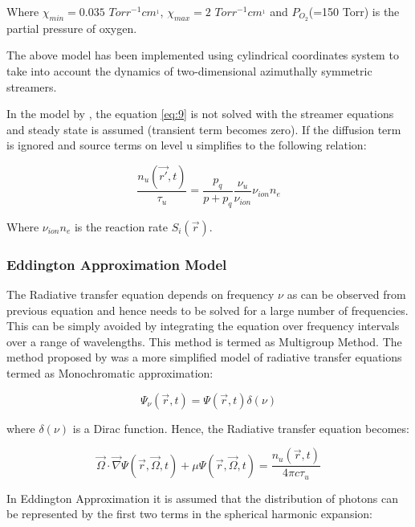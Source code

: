 \documentclass{article}
\begin{document}
Where $\chi_{min}= 0.035$ $Torr^{-1} cm^_1$, $\chi_{max}= 2$ $Torr^{-1} cm^_1$ and $P_O_2$(=150 Torr) is the partial pressure of oxygen.

The above model has been implemented using cylindrical coordinates system to take into account the dynamics of two-dimensional azimuthally symmetric streamers.

In the model by \cite{ZhelezniakM.B.andMnatsakanianA.K.andSizykh1982PhotoionizationDischarge}, the equation \ref{eq:9} is not solved with the streamer equations and steady state is assumed (transient term becomes zero). If the diffusion term is ignored and source terms on level u simplifies to the following relation:

\begin{equation}
\frac{n_u(\vec{r'},t)}{\tau_u} = \frac{p_q}{p+p_q} \frac{\nu_u}{\nu_{ion}} \nu_{ion} n_e
\end{equation} 

Where $\nu_{ion} n_e$ is the reaction rate $S_i(\vec{r})$.






\subsubsection{Eddington Approximation Model}
The Radiative transfer equation depends on frequency $\nu$ as can be observed from previous equation and hence needs to be solved for a large number of frequencies. This can be simply avoided by integrating the equation over frequency intervals over a range of wavelengths. This method is termed as Multigroup Method. The method proposed by \cite{Segur2006} was a more simplified model of radiative transfer equations termed as Monochromatic approximation:

\begin{equation}
\Psi_\nu(\vec{r},t) = \Psi(\vec{r},t) \delta(\nu)
\end{equation} 

where $\delta(\nu)$ is a Dirac function. Hence, the Radiative transfer equation becomes:

\begin{equation} \label{eq:10}
\vec{\Omega} \cdot \vec{\nabla} \Psi(\vec{r},\vec{\Omega},t) + \mu\Psi(\vec{r},\vec{\Omega},t) = \frac{n_u (\vec{r},t)}{4 \pi c \tau_{u}}
\end{equation}

In Eddington Approximation it is assumed that the distribution of photons can be represented by the first two terms in the spherical harmonic expansion:
\end{document}
